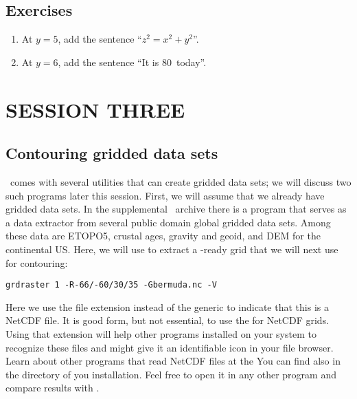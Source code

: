 \documentclass{report}
\begin{document}
\section{Exercises}

\begin{enumerate}

\item At $y = 5$, add the sentence ``$z^2 = x^2 + y^2$''.

\item At $y = 6$, add the sentence ``It is 80\DS\ today''.

\end{enumerate}

\chapter{SESSION THREE}
\thispagestyle{headings}

\section{Contouring gridded data sets}

\GMT\ comes with several utilities that can create gridded data
sets; we will discuss two such programs later this session.  First,
we will assume that we already have gridded data sets.  In the
supplemental \GMT\ archive there is a program that serves as a data
extractor from several public domain global gridded data sets.
Among these data are ETOPO5, crustal ages, gravity and geoid,
and DEM for the continental US.  Here, we will use 
to extract a \GMT-ready grid that we will next use for contouring:

\begin{verbatim}
grdraster 1 -R-66/-60/30/35 -Gbermuda.nc -V
\end{verbatim} 

Here we use the file extension  instead of the generic 
to indicate that this is a NetCDF file. It is good form, but not essential,
to use the  for NetCDF grids. Using that extension will help
other programs installed on your system to recognize these files and might
give it an identifiable icon in your file browser.
Learn about other programs that read NetCDF files at the
You can find  also in the  directory of you \GMT{}
installation.  Feel free to open it in any other program and compare results with \GMT.
\end{document}
